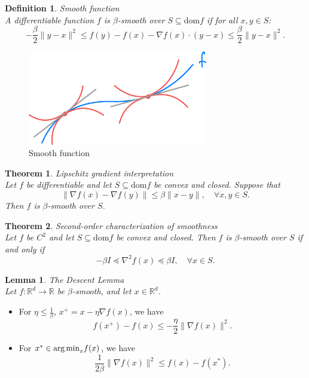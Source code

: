 \documentclass[11pt]{book} %
\newtheorem{theorem}{Theorem}[section]
\newtheorem{lemma}{Lemma}[section]
\newtheorem{definition}{Definition}[section]
\begin{document}
\begin{definition} {Smooth function} \\
    A differentiable function \( f \) is \(\beta\)-smooth over \( S \subseteq \text{dom} f \) if for all \( x, y \in S \):
    \[-\frac{\beta}{2} \|y - x\|^2 \leq f(y) - f(x) - \nabla f(x) \cdot (y - x) \leq \frac{\beta}{2} \|y - x\|^2.\]
\end{definition}


\begin{figure}[H]
    \centering
    \includegraphics[width=0.7\textwidth]{Figs/beta_smooth_function.png}
    \caption{Smooth function}
\end{figure}


\begin{theorem} {Lipschitz gradient interpretation } \\
Let \( f \) be differentiable and let \( S \subseteq \text{dom} f \) be convex and closed. Suppose that
\[\|\nabla f(x) - \nabla f(y)\| \leq \beta \|x - y\|, \quad \forall x, y \in S.\]
Then \( f \) is \(\beta\)-smooth over \( S \).
\end{theorem}

\begin{theorem} {Second-order characterization of smoothness} \\
Let \( f \) be \( C^2 \) and let \( S \subseteq \text{dom} f \) be convex and closed. Then \( f \) is \(\beta\)-smooth over \( S \) if and only if
\[-\beta I \preceq \nabla^2 f(x) \preceq \beta I, \quad \forall x \in S.\]
\end{theorem}


\begin {lemma} {The Descent Lemma} \\
Let \( f : \mathbb{R}^d \rightarrow \mathbb{R} \) be \(\beta\)-smooth, and let \( x \in \mathbb{R}^d \).
\end{lemma}

\begin{itemize}
    \item For \( \eta \leq \frac{1}{\beta} \), \( x^{+} = x - \eta \nabla f(x) \), we have
    \[ f(x^{+}) - f(x) \leq -\frac{\eta}{2} \|\nabla f(x)\|^2. \]
    \item For \( x^{*} \in \text{arg\,min}_x f(x) \), we have
    \[ \frac{1}{2\beta} \|\nabla f(x)\|^2 \leq f(x) - f(x^{*}). \]
\end{itemize}
\end{document}
